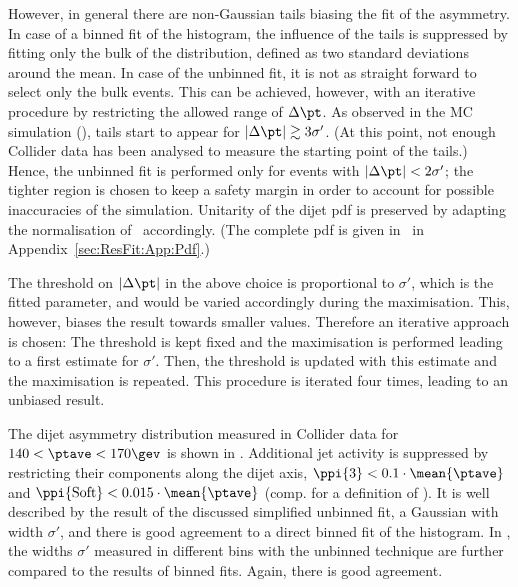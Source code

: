 However, in general there are non-Gaussian tails biasing the fit of the asymmetry.
In case of a binned fit of the histogram, the influence of the tails is suppressed by
fitting only the bulk of the distribution, defined as two standard deviations around the mean.
In case of the unbinned fit, it is not as straight forward to select only the bulk events.
This can be achieved, however, with an iterative procedure by restricting the allowed range of \mbox{$\Delta\pt$}.
As observed in the MC simulation (), tails start to appear for \mbox{$|\Delta\pt| \gtrsim 3\sigma'$}.
(At this point, not enough Collider data has been analysed to measure the starting point of the tails.)
Hence, the unbinned fit is performed only for events with \mbox{$|\Delta\pt| < 2\sigma'$}; the tighter region is chosen to keep a safety margin in order to account for possible inaccuracies of the simulation.
Unitarity of the dijet pdf is preserved by adapting the normalisation of~ accordingly.
(The complete pdf is given in~ in Appendix~\ref{sec:ResFit:App:Pdf}.)

The threshold on $|\Delta\pt|$ in the above choice is proportional to $\sigma'$, which is the fitted parameter, and would be varied accordingly during the maximisation.
This, however, biases the result towards smaller values.
Therefore an iterative approach is chosen:
The threshold is kept fixed and the maximisation is performed leading
to a first estimate for $\sigma'$.
Then, the threshold is updated with this estimate and the maximisation is repeated.
This procedure is iterated four times, leading to an unbiased result.

The dijet asymmetry distribution measured in Collider data for \mbox{$140 <
  \ptave < 170\gev$} is shown in
.
Additional jet activity is suppressed by restricting their \pt components
along the dijet axis, \mbox{$\ppi{3} < 0.1\cdot\mean{\ptave}$} and
\mbox{$\ppi{\text{Soft}} < 0.015\cdot\mean{\ptave}$} (comp.  for
a definition of \pp).
It is well described by the result of the discussed simplified unbinned fit, \ie a Gaussian with width $\sigma'$, and there is good agreement to a direct binned fit of the histogram.
In , the widths $\sigma'$ measured in different \ptave bins with the unbinned technique are further compared to the results of binned fits.
Again, there is good agreement.

